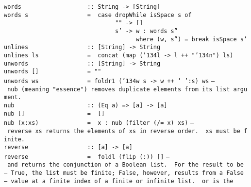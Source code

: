 %
\eprogB\noindent\bprogB
\mbox{\tt words\ \ \ \ \ \ \ \ \ \ \ \ \ \ \ \ \ \ \ ::\ String\ ->\ [String]}\\
\mbox{\tt words\ s\ \ \ \ \ \ \ \ \ \ \ \ \ \ \ \ \ =\ \ case\ dropWhile\ isSpace\ s\ of}\\
\mbox{\tt \ \ \ \ \ \ \ \ \ \ \ \ \ \ \ \ \ \ \ \ \ \ \ \ \ \ \ \ \ \ \ \ ""\ ->\ []}\\
\mbox{\tt \ \ \ \ \ \ \ \ \ \ \ \ \ \ \ \ \ \ \ \ \ \ \ \ \ \ \ \ \ \ \ \ s'\ ->\ w\ :\ words\ s''}\\
\mbox{\tt \ \ \ \ \ \ \ \ \ \ \ \ \ \ \ \ \ \ \ \ \ \ \ \ \ \ \ \ \ \ \ \ \ \ \ \ \ \ where\ (w,\ s'')\ =\ break\ isSpace\ s'}
%
\eprogB\noindent\bprogB
\mbox{\tt unlines\ \ \ \ \ \ \ \ \ \ \ \ \ \ \ \ \ ::\ [String]\ ->\ String}\\
\mbox{\tt unlines\ ls\ \ \ \ \ \ \ \ \ \ \ \ \ \ =\ \ concat\ (map\ ({\char'134}l\ ->\ l\ ++\ "{\char'134}n")\ ls)}
%
\eprogB\noindent\bprogB
\mbox{\tt unwords\ \ \ \ \ \ \ \ \ \ \ \ \ \ \ \ \ ::\ [String]\ ->\ String}\\
\mbox{\tt unwords\ []\ \ \ \ \ \ \ \ \ \ \ \ \ \ =\ ""}\\
\mbox{\tt unwords\ ws\ \ \ \ \ \ \ \ \ \ \ \ \ \ =\ foldr1\ ({\char'134}w\ s\ ->\ w\ ++\ '\ ':s)\ ws}
%
\eprogB\noindent\bprogB
\mbox{\tt --\ nub\ (meaning\ "essence")\ removes\ duplicate\ elements\ from\ its\ list\ argument.}\\
\mbox{\tt nub\ \ \ \ \ \ \ \ \ \ \ \ \ \ \ \ \ \ \ \ \ ::\ (Eq\ a)\ =>\ [a]\ ->\ [a]}\\
\mbox{\tt nub\ []\ \ \ \ \ \ \ \ \ \ \ \ \ \ \ \ \ \ =\ \ []}\\
\mbox{\tt nub\ (x:xs)\ \ \ \ \ \ \ \ \ \ \ \ \ \ =\ \ x\ :\ nub\ (filter\ (/=\ x)\ xs)}
%
\eprogB\noindent\bprogB
\mbox{\tt --\ reverse\ xs\ returns\ the\ elements\ of\ xs\ in\ reverse\ order.\ \ xs\ must\ be\ finite.}\\
\mbox{\tt reverse\ \ \ \ \ \ \ \ \ \ \ \ \ \ \ \ \ ::\ [a]\ ->\ [a]}\\
\mbox{\tt reverse\ \ \ \ \ \ \ \ \ \ \ \ \ \ \ \ \ =\ \ foldl\ (flip\ (:))\ []}
%
\eprogB\noindent\bprogB
\mbox{\tt --\ and\ returns\ the\ conjunction\ of\ a\ Boolean\ list.\ \ For\ the\ result\ to\ be}\\
\mbox{\tt --\ True,\ the\ list\ must\ be\ finite;\ False,\ however,\ results\ from\ a\ False}\\
\mbox{\tt --\ value\ at\ a\ finite\ index\ of\ a\ finite\ or\ infinite\ list.\ \ or\ is\ the}\\
